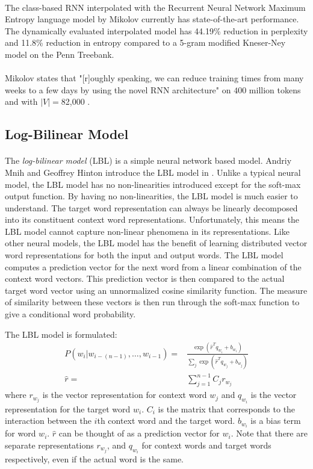 \paragraph{}
The class-based RNN interpolated with the Recurrent Neural Network Maximum Entropy language model by Mikolov \cite{Mikolov2012} currently has state-of-the-art performance. The dynamically evaluated interpolated model has 44.19\% reduction in perplexity and 11.8\% reduction in entropy compared to a 5-gram modified Kneser-Ney model on the Penn Treebank.
\paragraph{}
Mikolov states that "[r]oughly speaking, we can reduce training times from many weeks to a few days by using the novel RNN architecture" on $400$ million tokens and with $|V|=$82,000 \cite[pg. 93]{Mikolov2012}. 

\subsection{Log-Bilinear Model} \label{sec:lbl}
\paragraph{}
The \emph{log-bilinear model} (LBL) is a simple neural network based model. Andriy Mnih and Geoffrey Hinton introduce the LBL model in \cite{MnihHinton2007}. Unlike a typical neural model, the LBL model has no non-linearities introduced except for the soft-max output function. By having no non-linearities, the LBL model is much easier to understand. The target word representation can always be linearly decomposed into its constituent context word representations. Unfortunately, this means the LBL model cannot capture non-linear phenomena in its representations. Like other neural models, the LBL model has the benefit of learning distributed vector word representations for both the input and output words.  The LBL model computes a prediction vector for the next word from a linear combination of the context word vectors. This prediction vector is then compared to the actual target word vector using an unnormalized cosine similarity function. The measure of similarity between these vectors is then run through the soft-max function to give a conditional word probability.

The LBL model is formulated:
\begin{align}
P(w_i | w_{i-(n-1)},\dots, w_{i-1})  =& \frac{ \exp( \hat{r}^T q_{w_i} +b_{w_i}) } { \sum_j \exp( \hat{r}^T q_{w_j} +b_{w_j})} \label{eq:LBL}
\\ 
\hat{r} =& \sum_{j=1}^{n-1} C_j r_{w_j} \nonumber
\end{align} 
where $r_{w_j}$ is the vector representation for context word $w_j$ and $q_{w_i}$ is the vector representation for the target word $w_i$. $C_i$ is the matrix that corresponds to the interaction between the $i$th context word and the target word. $b_{w_i}$ is a bias term for word $w_i$. $\hat{r}$ can be thought of as a prediction vector for $w_i$. Note that there are separate representations $r_{w_j}$, and $q_{w_i}$ for context words and target words respectively, even if the actual word is the same.

